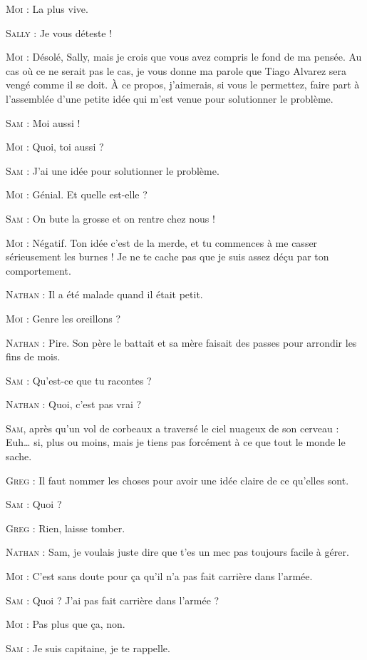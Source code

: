 \begin{dialogue}
\textsc{Moi} : La plus vive.

\textsc{Sally} : Je vous déteste !

\textsc{Moi} : Désolé, Sally, mais je crois que vous avez compris le fond de ma pensée. Au cas où ce ne serait pas le cas, je vous donne ma parole que Tiago Alvarez sera vengé comme il se doit. À ce propos, j’aimerais, si vous le permettez, faire part à l’assemblée d’une petite idée qui m’est venue pour solutionner le problème.

\textsc{Sam} : Moi aussi !

\textsc{Moi} : Quoi, toi aussi ?

\textsc{Sam} : J’ai une idée pour solutionner le problème.

\textsc{Moi} : Génial. Et quelle est-elle ?

\textsc{Sam} : On bute la grosse et on rentre chez nous !

\textsc{Moi} : Négatif. Ton idée c’est de la merde, et tu commences à me casser sérieusement les burnes ! Je ne te cache pas que je suis assez déçu par ton comportement.

\textsc{Nathan} : Il a été malade quand il était petit.

\textsc{Moi} : Genre les oreillons ?

\textsc{Nathan} : Pire. Son père le battait et sa mère faisait des passes pour arrondir les fins de mois.

\textsc{Sam} : Qu’est-ce que tu racontes ?

\textsc{Nathan} : Quoi, c’est pas vrai ?

\textsc{Sam}, après qu’un vol de corbeaux a traversé le ciel nuageux de son cerveau : Euh… si, plus ou moins, mais je tiens pas forcément à ce que tout le monde le sache.

\textsc{Greg} : Il faut nommer les choses pour avoir une idée claire de ce qu’elles sont.

\textsc{Sam} : Quoi ?

\textsc{Greg} : Rien, laisse tomber.

\textsc{Nathan} : Sam, je voulais juste dire que t’es un mec pas toujours facile à gérer.

\textsc{Moi} : C’est sans doute pour ça qu’il n’a pas fait carrière dans l’armée.

\textsc{Sam} : Quoi ? J’ai pas fait carrière dans l’armée ?

\textsc{Moi} : Pas plus que ça, non.

\textsc{Sam} : Je suis capitaine, je te rappelle.


\end{dialogue}
